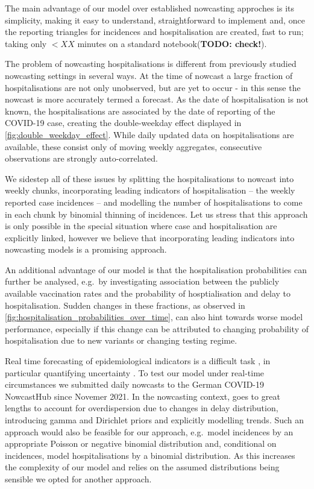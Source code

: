 The main advantage of our model over established nowcasting approches is
its simplicity, making it easy to understand, straightforward to
implement and, once the reporting triangles for incidences and
hospitalisation are created, fast to run; taking only \(< XX\) minutes
on a standard notebook(\textbf{TODO: check!}).

The problem of nowcasting hospitalisations is different from previously
studied nowcasting settings in several ways. At the time of nowcast a
large fraction of hospitalisations are not only unobserved, but are yet
to occur - in this sense the nowcast is more accurately termed a
forecast. As the date of hospitalisation is not known, the
hospitalisations are associated by the date of reporting of the COVID-19
case, creating the double-weekday effect displayed in
\cref{fig:double_weekday_effect}. While daily updated data on
hospitalisations are available, these consist only of moving weekly
aggregates, consecutive observations are strongly auto-correlated.

We sidestep all of these issues by splitting the hospitalisations to
nowcast into weekly chunks, incorporating leading indicators of
hospitalisation -- the weekly reported case incidences -- and modelling
the number of hospitalisations to come in each chunk by binomial
thinning of incidences. Let us stress that this approach is only
possible in the special situation where case and hospitalisation are
explicitly linked, however we believe that incorporating leading
indicators into nowcasting models is a promising approach.

An additional advantage of our model is that the hospitalisation
probabilities can further be analysed, e.g.~by investigating association
between the publicly available vaccination rates and the probability of
hosptialisation and delay to hospitalisation. Sudden changes in these
fractions, as observed in 
\cref{fig:hospitalisation_probabilities_over_time}, can also hint towards
worse model performance, especially if this change can be attributed to
changing probability of hospitalisation due to new variants or changing
testing regime.

Real time forecasting of epidemiological indicators is a difficult task
\citep{Desai2019Realtime}, in particular quantifying uncertainty
\citep{Bracher2021Preregistered}. To test our model under real-time
circumstances we submitted daily nowcasts to the German COVID-19
NowcastHub \citep{2022Nowcasts} since Novemer 2021. In the nowcasting
context, \citep{Lawless1994Adjustments} goes to great lengths to
account for overdispersion due to changes in delay distribution,
introducing gamma and Dirichlet priors and explicitly modelling trends.
Such an approach would also be feasible for our approach, e.g.~model
incidences by an appropriate Poisson or negative binomial distribution
and, conditional on incidences, model hospitalisations by a binomial
distribution. As this increases the complexity of our model and relies
on the assumed distributions being sensible we opted for another
approach.

